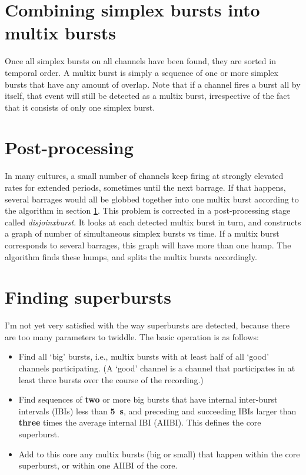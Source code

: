 \documentclass{article}
\begin{document}
\section{Combining simplex bursts into multix bursts}\label{multix}

Once all simplex bursts on all channels have been found, they are
sorted in temporal order. A multix burst is simply a sequence of one
or more simplex bursts that have any amount of overlap. Note that if a
channel fires a burst all by itself, that event will still be detected
as a multix burst, irrespective of the fact that it consists of only
one simplex burst.

\section{Post-processing}

In many cultures, a small number of channels keep firing at strongly
elevated rates for extended periods, sometimes until the next barrage.
If that happens, several barrages would all be globbed together into one
multix burst according to the algorithm in section \ref{multix}. This
problem is corrected in a post-processing stage called {\it
disjoinxburst}. It looks at each detected multix burst in turn, and
constructs a graph of number of simultaneous simplex bursts vs time.
If a multix burst corresponds to several barrages, this graph will
have more than one hump. The algorithm finds these humps, and splits
the multix bursts accordingly.

\section{Finding superbursts}

I'm not yet very satisfied with the way superbursts are detected,
because there are too many parameters to twiddle. The basic operation
is as follows:

\begin{itemize}
\item Find all `big' bursts, i.e., multix bursts with at least half of
all `good' channels participating. (A `good' channel is a channel that
participates in at least three bursts over the course of the
recording.)

\item Find sequences of {\bf two} or more big bursts that have internal
inter-burst intervals (IBIs) less than {\bf 5~s}, and preceding and
succeeding IBIs larger than {\bf three} times the average internal
IBI (AIIBI). This defines the core superburst. 

\item Add to this core any multix bursts (big or small) that happen
within the core superburst, or within one AIIBI of the core.
\end{itemize}
\end{document}
